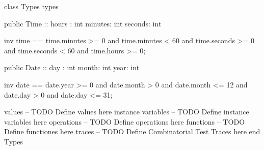\begin{vdmpp}[breaklines=true]
class Types
types
   
 public Time :: hours : int
        minutes: int
        seconds: int

  inv time == 
   time.minutes >= 0 and time.minutes < 60 and
   time.seconds >= 0 and time.seconds < 60 and
   time.hours >= 0;
      
public Date :: day : int
        month: int
        year: int

 inv date ==
  date.year >= 0 and date.month > 0 and date.month <= 12 and date.day > 0 and date.day <= 31;
  
values
-- TODO Define values here
instance variables
-- TODO Define instance variables here
operations
-- TODO Define operations here
functions
-- TODO Define functiones here
traces
-- TODO Define Combinatorial Test Traces here
end Types
\end{vdmpp}

